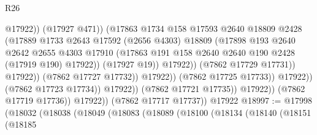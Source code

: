 \begin{lexlean}{R26}
\begin{coremodule}
                                                  @17922))
                                              (@17927 @471))
                                            (@17863
                                              @1734
                                              @158
                                              @17593
                                              @2640
                                              @18809
                                              @2428
                                              (@17889
                                                @1733
                                                @2643
                                                @17592
                                                (@2656 @4303)
                                                @18809
                                                (@17898
                                                  @193
                                                  @2640
                                                  @2642
                                                  @2655
                                                  @4303
                                                  @17910
                                                  (@17863
                                                    @191
                                                    @158
                                                    @2640
                                                    @2640
                                                    @190
                                                    @2428
                                                    (@17919 @190)
                                                    @17922))
                                                (@17927 @19))
                                              @17922))
                                          (@7862 @17729 @17731))
                                        @17922))
                                    (@7862 @17727 @17732))
                                  @17922))
                              (@7862 @17725 @17733))
                            @17922))
                        (@7862 @17723 @17734))
                      @17922))
                  (@7862 @17721 @17735))
                @17922))
            (@7862 @17719 @17736))
          @17922))
      (@7862 @17717 @17737))
    @17922
@18997 := @17998
    (@18032
      (@18038
        (@18049
          (@18083
            (@18089
              (@18100
                (@18134
                  (@18140
                    (@18151
                      (@18185

\end{coremodule}
\end{lexlean}
